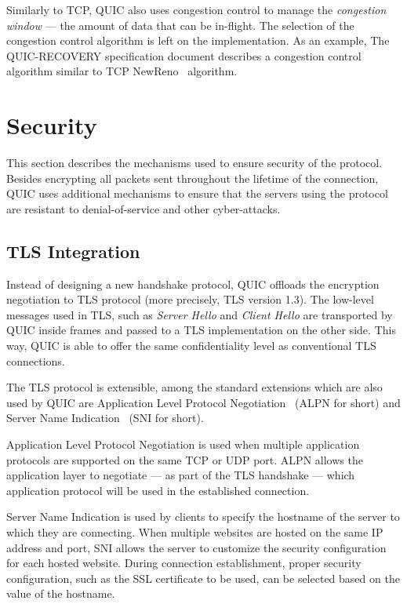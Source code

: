Similarly to TCP, QUIC also uses congestion control to manage the \textit{congestion window} --- the
amount of data that can be in-flight. The selection of the congestion control algorithm is left on
the implementation. As an example, The QUIC-RECOVERY specification document describes a congestion
control algorithm similar to TCP NewReno~\cite{rfc6582} algorithm.

\section{Security}

This section describes the mechanisms used to ensure security of the protocol. Besides encrypting
all packets sent throughout the lifetime of the connection, QUIC uses additional mechanisms to
ensure that the servers using the protocol are resistant to denial-of-service and other
cyber-attacks.

\subsection{TLS Integration}

Instead of designing a new handshake protocol, QUIC offloads the encryption negotiation to TLS
protocol (more precisely, TLS version 1.3). The low-level messages used in TLS, such as
\textit{Server Hello} and \textit{Client Hello} are transported by QUIC inside \CRYPTO{} frames and
passed to a TLS implementation on the other side. This way, QUIC is able to offer the same
confidentiality level as conventional TLS connections.

The TLS protocol is extensible, among the standard extensions which are also used by QUIC are
Application Level Protocol Negotiation~\cite{rfc7301} (ALPN for short) and Server Name
Indication~\cite{rfc6066} (SNI for short).

Application Level Protocol Negotiation is used when multiple application protocols are supported on
the same TCP or UDP port. ALPN allows the application layer to negotiate --- as part of the TLS
handshake --- which application protocol will be used in the established connection.

Server Name Indication is used by clients to specify the hostname of the server to which they are
connecting. When multiple websites are hosted on the same IP address and port, SNI allows the server
to customize the security configuration for each hosted website. During connection establishment,
proper security configuration, such as the SSL certificate to be used, can be selected based on the
value of the hostname.

